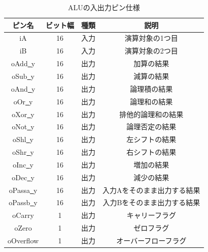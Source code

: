 \documentclass[a4paper,11pt]{ltjsarticle}
\begin{document}
\begin{table}[H]
    \centering
    \caption{ALUの入出力ピン仕様}
    \label{tab:alu}
    \begin{tabular}{|c|c|c|c|}
        \hline
        ピン名                  & ビット幅 & 種類 & 説明             \\
        \hline
        iA                   & 16   & 入力 & 演算対象の1つ目       \\
        \hline
        iB                   & 16   & 入力 & 演算対象の2つ目       \\
        \hline
        oAdd\underline{~}y   & 16   & 出力 & 加算の結果          \\
        \hline
        oSub\underline{~}y   & 16   & 出力 & 減算の結果          \\
        \hline
        oAnd\underline{~}y   & 16   & 出力 & 論理積の結果         \\
        \hline
        oOr\underline{~}y    & 16   & 出力 & 論理和の結果         \\
        \hline
        oXor\underline{~}y   & 16   & 出力 & 排他的論理和の結果      \\
        \hline
        oNot\underline{~}y   & 16   & 出力 & 論理否定の結果        \\
        \hline
        oShl\underline{~}y   & 16   & 出力 & 左シフトの結果        \\
        \hline
        oShr\underline{~}y   & 16   & 出力 & 右シフトの結果        \\
        \hline
        oInc\underline{~}y   & 16   & 出力 & 増加の結果          \\
        \hline
        oDec\underline{~}y   & 16   & 出力 & 減少の結果          \\
        \hline
        oPassa\underline{~}y & 16   & 出力 & 入力Aをそのまま出力する結果 \\
        \hline
        oPassb\underline{~}y & 16   & 出力 & 入力Bをそのまま出力する結果 \\
        \hline
        oCarry               & 1    & 出力 & キャリーフラグ        \\
        \hline
        oZero                & 1    & 出力 & ゼロフラグ          \\
        \hline
        oOverflow            & 1    & 出力 & オーバーフローフラグ     \\
        \hline
    \end{tabular}
\end{table}
\end{document}
